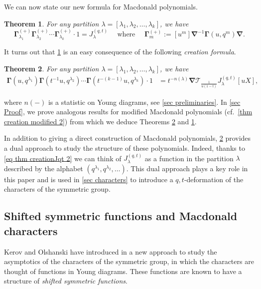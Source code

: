 \documentclass[12pt]{amsart}
\newtheorem{thm}{Theorem}[section]
\theoremstyle{remark}
\newcommand{\J}{{J}^{(q,t)}}
\newcommand{\nablaJ}{\boldsymbol{\nabla}}
\newcommand{\GammaJ}{\boldsymbol{\Gamma}}
\newcommand{\Top}{\mathcal{T}}
\newcommand{\GammaplusJ}[1]{ \mathbf{ \Gamma}^{(+)}_{#1}}
\begin{document}
We can now state our new formula for Macdonald polynomials.

\begin{thm} \label{thm creationJqt}
	For any partition $\lambda=[\lambda_1,\lambda_2,\dots,\lambda_k]$, we have
	\begin{equation}\label{eq thm creationJqt}
		\GammaplusJ{\lambda_1}\GammaplusJ{\lambda_2}\cdots\GammaplusJ{\lambda_k}\cdot1=\J_{\lambda}\quad \text{ where }\quad  \GammaplusJ{m}:=[u^m]\nablaJ^{-1}\GammaJ(u,q^m)\nablaJ.
	\end{equation}        
\end{thm}

It turns out that \cref{thm creationJqt} is an easy consequence of the following \emph{creation formula}.

\begin{thm}\label{thm creationJqt 2}
For any partition $\lambda=[\lambda_1,\lambda_2,\dots,\lambda_k]$, we have
 \begin{align}\label{eq thm creationJqt 2}
\GammaJ(u,q^{\lambda_1})\GammaJ(t^{-1}u,q^{\lambda_2})\cdots \GammaJ(t^{-(k-1)}u,q^{\lambda_k})\cdot 1 & =t^{-n(\lambda)}\nablaJ \Top_{\frac{1}{u(1-t)}} \J_\lambda[uX],
	\end{align}
\end{thm}
\noindent 
where $n(-)$ is  a statistic on Young diagrams, see \cref{sec preliminaries}.
\noindent In \cref{sec Proof}, we prove analogous results for modified Macdonald polynomials (cf.\ \cref{thm creation modified 2}) from which we deduce Theorems \ref{thm creationJqt 2} and \ref{thm creationJqt}.

In addition to giving a direct construction of Macdonald polynomials, \cref{thm creationJqt 2} provides a dual approach to study the structure of these polynomials. Indeed, thanks to \cref{eq thm creationJqt 2} we can think of $\J_\lambda$ as a function in the partition $\lambda$ described by the alphabet $(q^{\lambda_1},q^{\lambda_2},\dots)$. This dual approach plays a key role in this paper and is used in \cref{sec characters} to introduce a $q,t$-deformation of the characters of the symmetric group.

\subsection{Shifted symmetric functions and Macdonald characters}\label{ssec intro characters}
Kerov and Olshanski have introduced in \cite{KerovOlshanski1994} a new approach to study the asymptotics of the characters of the symmetric group, in which the characters are thought of functions in Young diagrams. These functions are known to have a structure of \textit{shifted symmetric functions}.
\end{document}
